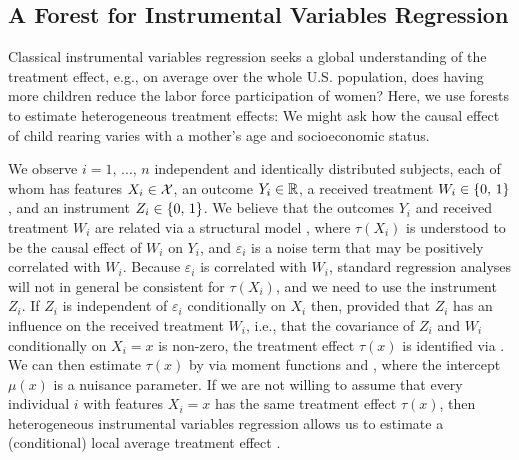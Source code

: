\documentclass[aos]{imsart}
\theoremstyle{plain}
\theoremstyle{definition}
\theoremstyle{remark}
\begin{document}
\begin{CJK}{UTF8}{gbsn}
{\subsection{A Forest for Instrumental Variables Regression}
\label{sec:iv_methods}

Classical instrumental variables regression seeks a global understanding of the treatment
effect, e.g., on average over the whole U.S. population, does having more children reduce the labor force participation
of women? Here, we use forests to estimate heterogeneous
treatment effects: We might ask how the causal effect of child rearing varies with a mother's age and
socioeconomic status.

We observe $i = 1, \, ..., \, n$ independent and identically distributed subjects,
each of whom has features $X_i \in \mathcal{X}$, an outcome $Y_i \in \mathbb{R}$, a received treatment $W_i \in \left\{0, \, 1\right\}$,
and an instrument $Z_i \in \left\{0, \, 1\right\}$. We believe that the outcomes $Y_i$ and received treatment $W_i$ are
related via a structural model
,
where $\tau(X_i)$ is understood to be the causal effect of $W_i$ on $Y_i$, and
$\varepsilon_i$ is a noise term that may be positively correlated with $W_i$. Because $\varepsilon_i$
is correlated with $W_i$, standard regression analyses will not in general be consistent for $\tau(X_i)$,
and we need to use the instrument $Z_i$. If $Z_i$ is independent of $\varepsilon_i$
conditionally on $X_i$ then, provided that $Z_i$ has an influence on the received treatment $W_i$, i.e., that
the covariance of $Z_i$ and $W_i$ conditionally on $X_i = x$ is non-zero, the treatment effect
$\tau(x)$ is identified via
.
We can then estimate $\tau(x)$ by via moment functions
 and
,
 where the intercept $\mu(x)$ is a nuisance parameter.
If we are not willing to assume that every individual $i$ with features
$X_i = x$ has the same treatment effect $\tau(x)$,
then heterogeneous instrumental variables regression
allows us to estimate a (conditional) local average treatment effect
\citep{abadie2003semiparametric,imbens1994identification}.
 
}
\end{CJK}
\end{document}
